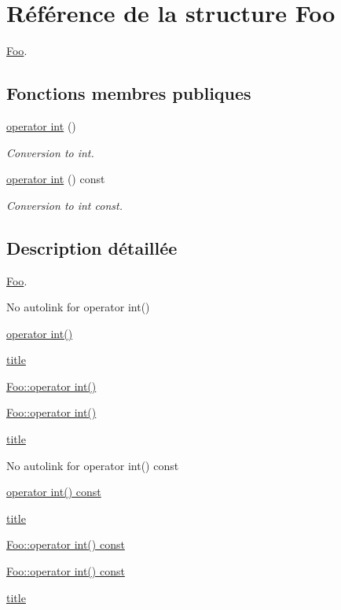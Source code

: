 \hypertarget{struct_foo}{}\section{Référence de la structure Foo}
\label{struct_foo}


\hyperlink{struct_foo}{Foo}.  


\subsection*{Fonctions membres publiques}
\begin{DoxyCompactItemize}
\item 
\hyperlink{struct_foo_aab9774d892b6cd4a0fbebd034b4c1fad}{operator int} ()
\begin{DoxyCompactList}\small\item\em Conversion to int. \end{DoxyCompactList}\item 
\hyperlink{struct_foo_a870f369cc7af9489418451e78d8bd539}{operator int} () const 
\begin{DoxyCompactList}\small\item\em Conversion to int const. \end{DoxyCompactList}\end{DoxyCompactItemize}


\subsection{Description détaillée}
\hyperlink{struct_foo}{Foo}. 


\begin{DoxyItemize}
\item No autolink for operator int()
\item \hyperlink{struct_foo_aab9774d892b6cd4a0fbebd034b4c1fad}{operator int()}
\item \hyperlink{struct_foo_aab9774d892b6cd4a0fbebd034b4c1fad}{title}
\item \hyperlink{struct_foo_aab9774d892b6cd4a0fbebd034b4c1fad}{Foo\+::operator int()}
\item \hyperlink{struct_foo_aab9774d892b6cd4a0fbebd034b4c1fad}{Foo\+::operator int()}
\item \hyperlink{struct_foo_aab9774d892b6cd4a0fbebd034b4c1fad}{title}
\item No autolink for operator int() const
\item \hyperlink{struct_foo_a870f369cc7af9489418451e78d8bd539}{operator int() const}
\item \hyperlink{struct_foo_a870f369cc7af9489418451e78d8bd539}{title}
\item \hyperlink{struct_foo_a870f369cc7af9489418451e78d8bd539}{Foo\+::operator int() const}
\item \hyperlink{struct_foo_a870f369cc7af9489418451e78d8bd539}{Foo\+::operator int() const}
\item \hyperlink{struct_foo_a870f369cc7af9489418451e78d8bd539}{title} 
\end{DoxyItemize}

